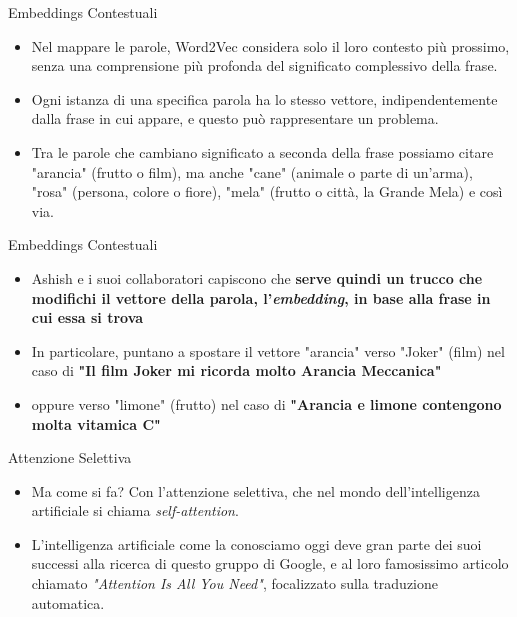 \documentclass[aspectratio=169]{beamer}
\begin{document}
%
%
\begin{frame}{Embeddings Contestuali}
\begin{itemize}
\item Nel mappare le parole, Word2Vec considera solo il loro
contesto più prossimo, senza una comprensione più profonda del
significato complessivo della frase. 
\item Ogni istanza di una specifica
parola ha lo stesso vettore, indipendentemente dalla frase in cui
appare, e questo può rappresentare un problema.
\item Tra le parole che cambiano significato a seconda della frase possiamo
citare "arancia" (frutto o film), ma anche "cane" (animale o parte
di un'arma), "rosa" (persona, colore o fiore), "mela" (frutto o
città, la Grande Mela) e così via.
\end{itemize}
\end{frame}
%
%
\begin{frame}{Embeddings Contestuali}
\begin{itemize}
\item Ashish e i suoi collaboratori capiscono che \textbf{serve quindi un trucco che modifichi il vettore della parola, l'\emph{embedding}, in base alla frase in cui essa si trova}
\item In particolare, puntano a spostare il vettore "arancia" verso "Joker" (film) nel caso di \textbf{"Il film Joker mi ricorda molto Arancia Meccanica"}
\item oppure verso "limone" (frutto) nel caso di \textbf{"Arancia e limone contengono molta vitamica C"}
\end{itemize}
\end{frame}
%
%
\begin{frame}{Attenzione Selettiva}
\begin{itemize}
\item Ma come si fa? Con l'attenzione selettiva, che nel mondo
dell'intelligenza artificiale si chiama \emph{self-attention}.
\item L'intelligenza artificiale come la conosciamo oggi deve gran parte dei suoi successi alla ricerca di questo gruppo di Google, e al loro famosissimo articolo chiamato \emph{"Attention Is All You Need"}, focalizzato sulla traduzione automatica. 
\end{itemize}
\end{frame}
\end{document}
